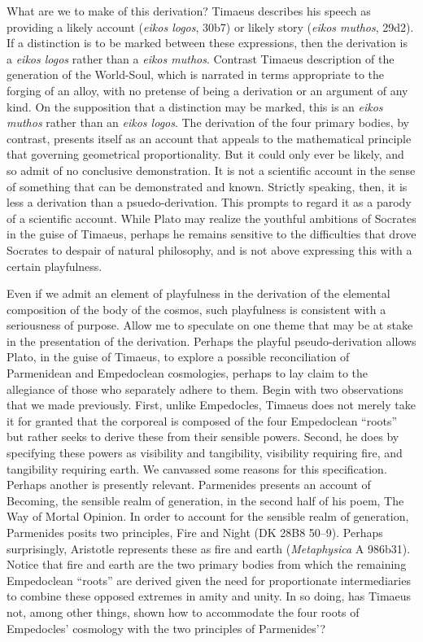 What are we to make of this derivation? Timaeus describes his speech as providing a likely account (\emph{eikos logos}, 30b7) or likely story (\emph{eikos muthos}, 29d2). If a distinction is to be marked between these expressions, then the derivation is a \emph{eikos logos} rather than a \emph{eikos muthos}. Contrast Timaeus description of the generation of the World-Soul, which is narrated in terms appropriate to the forging of an alloy, with no pretense of being a derivation or an argument of any kind. On the supposition that a distinction may be marked, this is an \emph{eikos muthos} rather than an \emph{eikos logos}. The derivation of the four primary bodies, by contrast, presents itself as an account that appeals to the mathematical principle that governing geometrical proportionality. But it could only ever be likely, and so admit of no conclusive demonstration. It is not a scientific account in the sense of something that can be demonstrated and known. Strictly speaking, then, it is less a derivation than a psuedo-derivation. This prompts \citet{Prtichard:1990aa} to regard it as a parody of a scientific account. While Plato may realize the youthful ambitions of Socrates in the guise of Timaeus, perhaps he remains sensitive to the difficulties that drove Socrates to despair of natural philosophy, and is not above expressing this with a certain playfulness.

Even if we admit an element of playfulness in the derivation of the elemental composition of the body of the cosmos, such playfulness is consistent with a seriousness of purpose. Allow me to speculate on one theme that may be at stake in the presentation of the derivation. Perhaps the playful pseudo-derivation allows Plato, in the guise of Timaeus, to explore a possible reconciliation of Parmenidean and Empedoclean cosmologies, perhaps to lay claim to the allegiance of those who separately adhere to them. Begin with two observations that we made previously. First, unlike Empedocles, Timaeus does not merely take it for granted that the corporeal is composed of the four Empedoclean ``roots'' but rather seeks to derive these from their sensible powers. Second, he does by specifying these powers as visibility and tangibility, visibility requiring fire, and tangibility requiring earth. We canvassed some reasons for this specification. Perhaps another is presently relevant. Parmenides presents an account of Becoming, the sensible realm of generation, in the second half of his poem, The Way of Mortal Opinion. In order to account for the sensible realm of generation, Parmenides posits two principles, Fire and Night (DK 28B8 50--9). Perhaps surprisingly, Aristotle represents these as fire and earth (\emph{Metaphysica} A 986b31). Notice that fire and earth are the two primary bodies from which the remaining Empedoclean ``roots'' are derived given the need for proportionate intermediaries to combine these opposed extremes in amity and unity. In so doing, has Timaeus not, among other things, shown how to accommodate the four roots of Empedocles' cosmology with the two principles of Parmenides'? 

